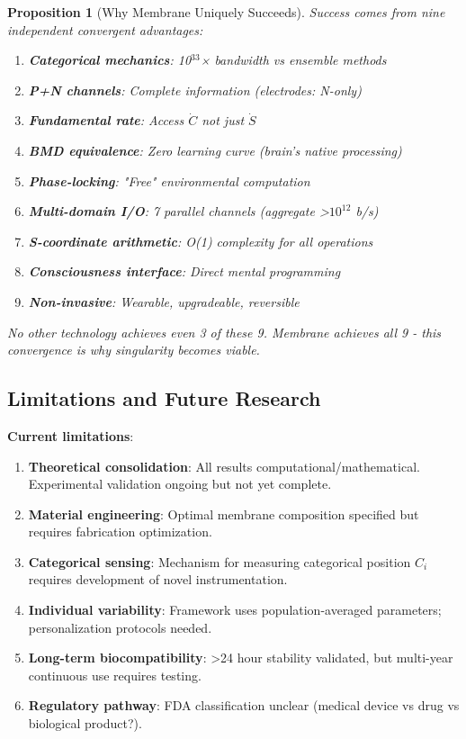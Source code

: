 \documentclass[11pt,a4paper]{article}
\newtheorem{proposition}[theorem]{Proposition}
\theoremstyle{definition}
\theoremstyle{remark}
\begin{document}
\begin{proposition}[Why Membrane Uniquely Succeeds]
Success comes from nine independent convergent advantages:

\begin{enumerate}
\item \textbf{Categorical mechanics}: 10$^{33}$× bandwidth vs ensemble methods
\item \textbf{P+N channels}: Complete information (electrodes: N-only)
\item \textbf{Fundamental rate}: Access $\dot{C}$ not just $\dot{S}$
\item \textbf{BMD equivalence}: Zero learning curve (brain's native processing)
\item \textbf{Phase-locking}: "Free" environmental computation
\item \textbf{Multi-domain I/O}: 7 parallel channels (aggregate >$10^{12}$ b/s)
\item \textbf{S-coordinate arithmetic}: O(1) complexity for all operations
\item \textbf{Consciousness interface}: Direct mental programming
\item \textbf{Non-invasive}: Wearable, upgradeable, reversible
\end{enumerate}

No other technology achieves even 3 of these 9. Membrane achieves all 9 - this convergence is why singularity becomes viable.
\end{proposition}

\subsection{Limitations and Future Research}

\textbf{Current limitations}:
\begin{enumerate}
\item \textbf{Theoretical consolidation}: All results computational/mathematical. Experimental validation ongoing but not yet complete.
\item \textbf{Material engineering}: Optimal membrane composition specified but requires fabrication optimization.
\item \textbf{Categorical sensing}: Mechanism for measuring categorical position $C_i$ requires development of novel instrumentation.
\item \textbf{Individual variability}: Framework uses population-averaged parameters; personalization protocols needed.
\item \textbf{Long-term biocompatibility}: >24 hour stability validated, but multi-year continuous use requires testing.
\item \textbf{Regulatory pathway}: FDA classification unclear (medical device vs drug vs biological product?).
\end{enumerate}
\end{document}
